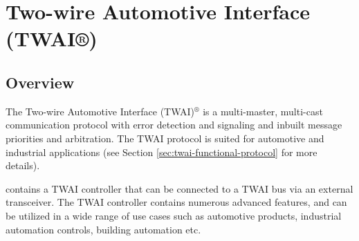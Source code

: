 \documentclass[main\_\_EN.tex]{subfiles}
\begin{document}

\ifglobal
\else
    {\let\clearpage\relax \listoftodos}
    \tableofcontents
\fi




\hypertarget{twai}{}
\chapter{Two-wire Automotive Interface (TWAI®)}
\label{mod:twai}
\section{Overview}

The Two-wire Automotive Interface (TWAI)$^\circledR$ is a multi-master, multi-cast communication protocol with error detection and signaling and inbuilt message priorities and arbitration. The TWAI protocol is suited for automotive and industrial applications (see Section \ref{sec:twai-functional-protocol} for more details).

\chipname{} contains a TWAI controller that can be connected to a TWAI bus via an external transceiver. The TWAI controller contains numerous advanced features, and can be utilized in a wide range of use cases such as automotive products, industrial automation controls, building automation etc.
\end{document}
